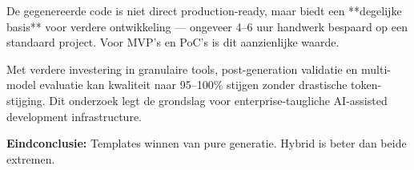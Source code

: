 De gegenereerde code is niet direct production-ready, maar biedt een **degelijke basis** voor verdere ontwikkeling — ongeveer 4--6 uur handwerk bespaard op een standaard project. Voor MVP's en PoC's is dit aanzienlijke waarde.

Met verdere investering in granulaire tools, post-generation validatie en multi-model evaluatie kan kwaliteit naar 95--100\% stijgen zonder drastische token-stijging. Dit onderzoek legt de grondslag voor enterprise-taugliche AI-assisted development infrastructure.

\noindent
\textbf{Eindconclusie:} Templates winnen van pure generatie. Hybrid is beter dan beide extremen.
